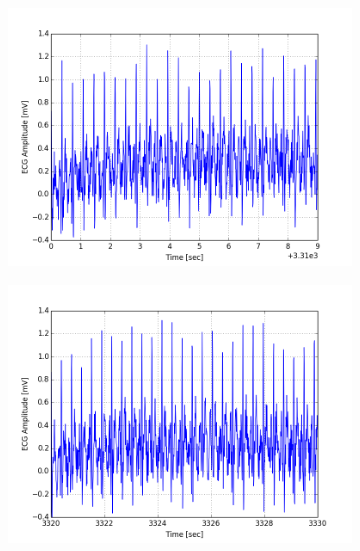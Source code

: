 \documentclass[paper=a4, fontsize=11pt]{scrartcl}
\numberwithin{equation}{section}		%
\numberwithin{figure}{section}			%
\numberwithin{table}{section}		    %
\begin{document}
\begin{appendices}
\begin{figure}[H]
	\centering
	\begin{subfigure}[b]{0.3\textwidth}
		\includegraphics[width=\textwidth]{sim/ecg_67}
	\end{subfigure}
	\begin{subfigure}[b]{0.3\textwidth}
		\includegraphics[width=\textwidth]{sim/ecg_68}
	\end{subfigure}
	\begin{subfigure}[b]{0.3\textwidth}

\end{subfigure}
\end{figure}
\end{appendices}
\end{document}
